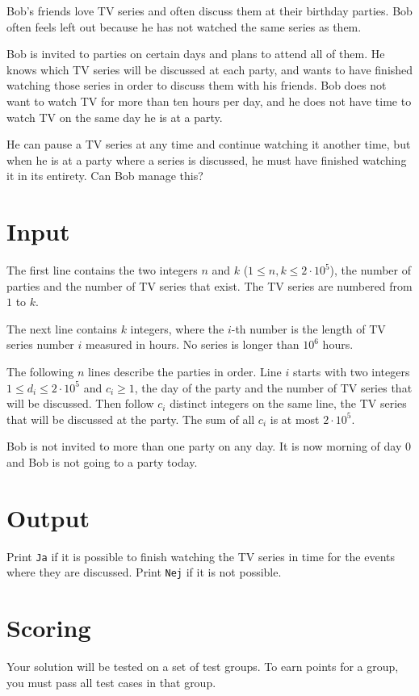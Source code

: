 Bob's friends love TV series and often discuss them at their birthday parties. Bob often feels left out because he has not watched the same series as them.

Bob is invited to parties on certain days and plans to attend all of them. He knows which TV series will be discussed at each party, and wants to have finished watching those series in order to discuss them with his friends. Bob does not want to watch TV for more than ten hours per day, and he does not have time to watch TV on the same day he is at a party.

He can pause a TV series at any time and continue watching it another time, but when he is at a party where a series is discussed, he must have finished watching it in its entirety. Can Bob manage this?

\section*{Input}
The first line contains the two integers $n$ and $k$ ($1 \leq n,k \leq 2 \cdot 10^5$), the number of parties and the number of TV series that exist. The TV series are numbered from $1$ to $k$.

The next line contains $k$ integers, where the $i$-th number is the length of TV series number $i$ measured in hours. No series is longer than $10^6$ hours.

The following $n$ lines describe the parties in order. Line $i$ starts with two integers $1 \leq d_i \leq 2 \cdot 10^5$ and $c_i \ge 1$, the day of the party and the number of TV series that will be discussed. Then follow $c_i$ distinct integers on the same line, the TV series that will be discussed at the party. The sum of all $c_i$ is at most $2 \cdot 10^5$.

Bob is not invited to more than one party on any day. It is now morning of day $0$ and Bob is not going to a party today.

\section*{Output}
Print \texttt{Ja} if it is possible to finish watching the TV series in time for the events where they are discussed. Print \texttt{Nej} if it is not possible.

\section*{Scoring}
Your solution will be tested on a set of test groups.
To earn points for a group, you must pass all test cases in that group.

